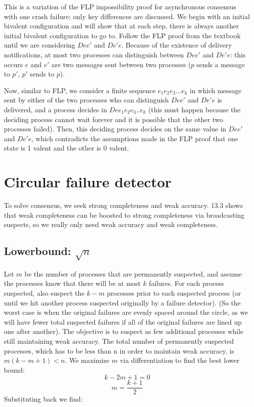 \documentclass{article}
\begin{document}
This is a variation of the FLP impossibility proof for asynchronous consensus with one crash failure; only key differences are discussed.  We begin with an initial bivalent configuration and will show that at each step, there is always another initial bivalent configuration to go to. Follow the FLP proof from the textbook until we are considering $Dee'$ and $De'e$. Because of the existence of delivery notifications, at most two processes can distinguish between $Dee'$ and $De'e$: this occurs $e$ and $e'$ are two messages sent between two processes ($p$ sends a message to $p'$, $p'$ sends to $p$). 

Now, similar to FLP, we consider a finite sequence $e_1e_2e_3...e_k$ in which message sent by either of the two processes who can distinguish $Dee'$ and $De'e$ is delivered, and a process decides in $Dee_1e_2e_3..e_k$ (this must happen because the deciding process cannot wait forever and it is possible that the other two processes failed). Then, this deciding process decides on the same value in $Dee'$ and $De'e$, which contradicts the assumptions made in the FLP proof that one state is 1 valent and the other is 0 valent. 

\section{Circular failure detector}

To solve consensus, we seek strong completeness and weak accuracy. 13.3 shows that weak completeness can be boosted to strong completeness via broadcasting suspects, so we really only need weak accuracy and weak completeness. 

\subsection{Lowerbound: $\sqrt{n}$}
	Let $m$ be the number of processes that are permanently suspected, and assume the processes know that there will be at most $k$ failures. For each process suspected, also suspect the $k-m$ processes prior to each suspected process (or until we hit another  process suspected originally by a failure detector). (So the worst case is when the original failures are evenly spaced around the circle, as we will have fewer total suspected failures if all of the original failures are lined up one after another).
	The objective is to suspect as few additional processes while still maintaining weak accuracy. The total number of permanently suspected processes, which has to be less than n in order to maintain weak accuracy, is $m(k-m+1) < n$. We maximize $m$ via differentiation to find the best lower bound:
$$
	k - 2m +1 = 0
$$
$$
	m = \frac{k+1}{2}
$$
Substituting back we find:
\end{document}
